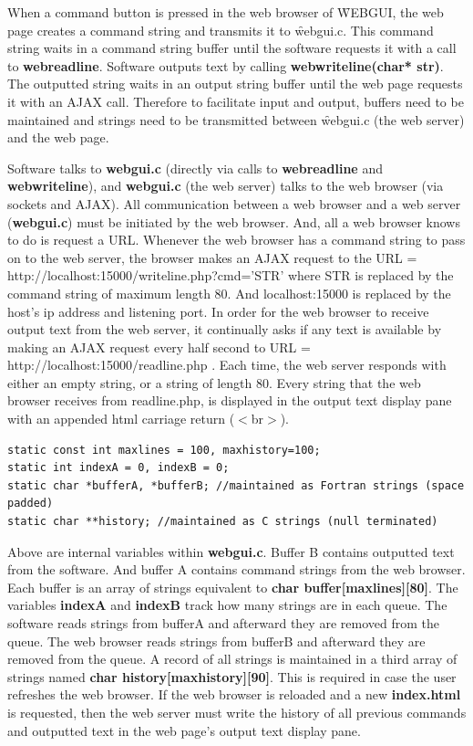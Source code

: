 When a command button is pressed in the web browser of \f{WEBGUI}, the web page creates a command string and transmits
it to \f{webgui.c}. This command string waits in a command string buffer until the software requests it with a call to \textbf{webreadline}.
Software outputs text by calling \textbf{webwriteline(char* str)}. The outputted string waits in an output string buffer until the
web page requests it with an AJAX call. Therefore to facilitate input and output, buffers need to be maintained and strings need to
be transmitted between \f{webgui.c} (the web server) and the web page.

Software talks to \textbf{webgui.c} (directly via calls to \textbf{webreadline} and \textbf{webwriteline}), and \textbf{webgui.c} (the web server) 
talks to the web browser (via sockets and AJAX). All communication between a web browser and a web server (\textbf{webgui.c}) must be initiated 
by the web browser. And, all a web browser knows to do is request a URL. Whenever the web browser has a command string to pass on to the 
web server, the browser makes an AJAX request to the URL = http://localhost:15000/writeline.php?cmd='STR' where STR is replaced by the
command string of maximum length 80. And localhost:15000 is replaced by the host's ip address and listening port. In order for the 
web browser to receive output text from the web server, it continually asks if any text is available by making an AJAX request every half
second to URL = http://localhost:15000/readline.php . Each time, the web server responds with either an empty string, or a string of length 80. 
Every string that the web browser receives from readline.php, is displayed in the output text display pane with an appended html carriage return 
($<$br$>$).

\begin{verbatim}
static const int maxlines = 100, maxhistory=100;
static int indexA = 0, indexB = 0;
static char *bufferA, *bufferB; //maintained as Fortran strings (space padded)
static char **history; //maintained as C strings (null terminated)
\end{verbatim}

Above are internal variables within \textbf{webgui.c}.
Buffer B contains outputted text from the software. And buffer A contains command strings from the web browser. Each buffer
is an array of strings equivalent to \textbf{char buffer[maxlines][80]}. The variables \textbf{indexA} and \textbf{indexB}
track how many strings are in each queue. The software reads strings from bufferA and afterward they are removed from the queue.
The web browser reads strings from bufferB and afterward they are removed from the queue. A record of all strings is maintained
in a third array of strings named \textbf{char history[maxhistory][90]}. This is required in case the user refreshes the web browser.
If the web browser is reloaded and a new \textbf{index.html} is requested, then the web server must write the history of all previous commands 
and outputted text in the web page's output text display pane.

